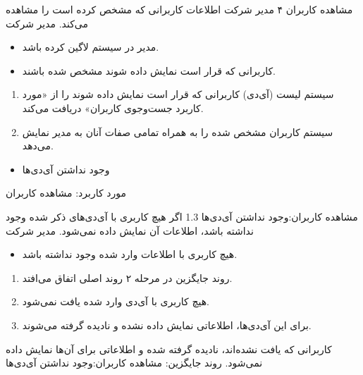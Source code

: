 {
\usecase
{مشاهده کاربران}
{۴}
{مدیر شرکت اطلاعات کاربرانی که مشخص کرده است را مشاهده می‌کند.}
{مدیر شرکت}
{}
{
		\begin{itemize}
		\item
		مدیر در سیستم لاگین کرده باشد.
		
		\item
		‌کاربرانی که قرار است نمایش داده شوند مشخص شده باشند.
	\end{itemize}
}
{
\begin{enumerate}
	\item 
	سیستم لیست (آی‌دی) کاربرانی که قرار است نمایش داده شوند را از «مورد کاربرد جست‌وجوی کاربران» دریافت می‌کند.
	
	\item
	سیستم کاربران مشخص شده را به همراه تمامی صفات آنان به مدیر نمایش می‌دهد.
\end{enumerate}
}
{
}
{
	\begin{itemize}
		\item 
		وجود نداشتن آی‌دی‌ها
	\end{itemize}
}
{مورد کاربرد: مشاهده کاربران}

\alternativeflow
{
	مشاهده کاربران:وجود‌ نداشتن آی‌دی‌ها
}
{1.3}
{
	اگر هیچ کاربری با آی‌دی‌های ذکر شده وجود نداشته باشد، اطلاعات آن نمایش داده نمی‌شود.
}
{
	مدیر شرکت
}
{}
{
	\begin{itemize}
		
		\item
		هیچ کاربری با اطلاعات وارد شده وجود نداشته باشد.
	\end{itemize}
}
{
	\vspace*{-0.6cm}
	\begin{enumerate}
		\item 
		روند جایگزین در مرحله ۲ روند اصلی اتفاق می‌افتد.
		\item
		هیچ کاربری با آی‌دی‌ وارد شده یافت نمی‌شود.
		\item 
		برای این آی‌دی‌ها، اطلاعاتی نمایش داده نشده و نادیده گرفته می‌شوند.
	\end{enumerate}
}
{
	کاربرانی که یافت نشده‌اند، نادیده گرفته شده و اطلاعاتی برای آن‌ها نمایش داده نمی‌شود.
}
{
	روند جایگزین:  مشاهده کاربران:وجود نداشتن آی‌دی‌ها
}
}


